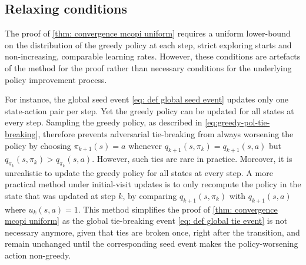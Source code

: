 \subsection{Relaxing conditions}
\label{sec: relaxing conditions}



The proof of \autoref{thm: convergence mcopi uniform}
requires a uniform lower-bound on the distribution of the greedy policy at each step, strict exploring starts and non-increasing, comparable learning rates.
However, these conditions are artefacts of the method for the proof rather than necessary conditions for the underlying policy improvement process.


For instance, the global seed event \eqref{eq: def global seed event} updates only one state-action pair per step. Yet the greedy policy can be updated for all states at every step.
Sampling the greedy policy, as described in \eqref{eq:greedy-pol-tie-breaking}, 
therefore prevents
adversarial tie-breaking from always worsening the policy by choosing $\pi_{k+1}(s)=a$
whenever
$q_{k+1}(s,\pi_k) = q_{k+1}(s,a)$ but $q_{\pi_k}(s,\pi_k) > q_{\pi_k}(s,a)$.
However, such ties are rare in practice.
Moreover, it is unrealistic to update the greedy policy for all states at every step.
A more practical method under initial-visit updates is to only recompute the policy in the state that was updated at step $k$,
by comparing $q_{k+1}(s, \pi_{k})$ with $q_{k+1}(s, a)$ where $u_{k}(s,a) = 1$.
This method simplifies the proof of \autoref{thm: convergence mcopi uniform} as the global tie-breaking event \eqref{eq: def global tie event} is not necessary anymore,
given that ties are broken once, right after the transition, 
and remain unchanged until the corresponding seed event makes the policy-worsening action non-greedy.


